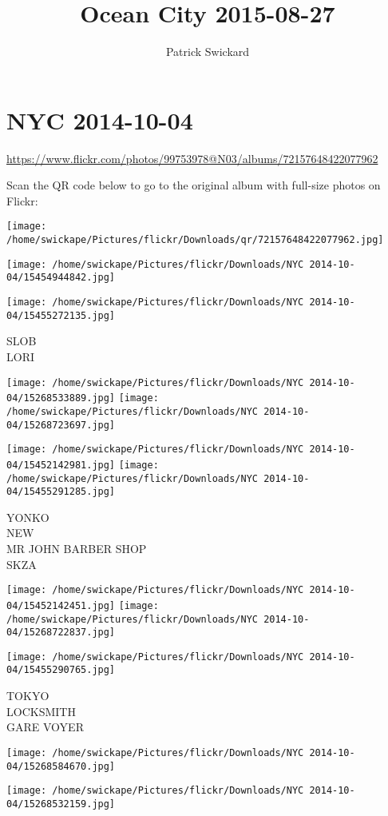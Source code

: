 \documentclass[10pt,letterpaper]{article}
\title{Ocean City 2015-08-27}
\author{Patrick Swickard}
\date{}
\begin{document}
\section*{NYC 2014-10-04}

\url{https://www.flickr.com/photos/99753978@N03/albums/72157648422077962}

Scan the QR code below to go to the original album with full-size photos on Flickr:

\texttt{[image: /home/swickape/Pictures/flickr/Downloads/qr/72157648422077962.jpg]}
\pagebreak

\texttt{[image: /home/swickape/Pictures/flickr/Downloads/NYC 2014-10-04/15454944842.jpg]}

\vspace{0.25in}
\texttt{[image: /home/swickape/Pictures/flickr/Downloads/NYC 2014-10-04/15455272135.jpg]}

SLOB\\
LORI
\pagebreak

\texttt{[image: /home/swickape/Pictures/flickr/Downloads/NYC 2014-10-04/15268533889.jpg]}
\texttt{[image: /home/swickape/Pictures/flickr/Downloads/NYC 2014-10-04/15268723697.jpg]}

\texttt{[image: /home/swickape/Pictures/flickr/Downloads/NYC 2014-10-04/15452142981.jpg]}
\texttt{[image: /home/swickape/Pictures/flickr/Downloads/NYC 2014-10-04/15455291285.jpg]}

YONKO\\
NEW\\
MR JOHN BARBER SHOP\\
SKZA
\pagebreak

\texttt{[image: /home/swickape/Pictures/flickr/Downloads/NYC 2014-10-04/15452142451.jpg]}
\texttt{[image: /home/swickape/Pictures/flickr/Downloads/NYC 2014-10-04/15268722837.jpg]}

\texttt{[image: /home/swickape/Pictures/flickr/Downloads/NYC 2014-10-04/15455290765.jpg]}

TOKYO\\
LOCKSMITH\\
GARE VOYER
\pagebreak

\texttt{[image: /home/swickape/Pictures/flickr/Downloads/NYC 2014-10-04/15268584670.jpg]}

\vspace{0.25in}
\texttt{[image: /home/swickape/Pictures/flickr/Downloads/NYC 2014-10-04/15268532159.jpg]}
\end{document}

